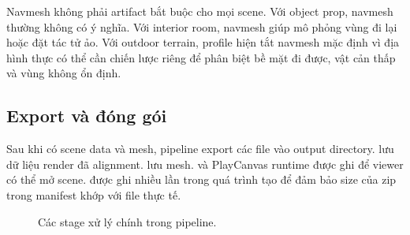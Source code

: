 Navmesh không phải artifact bắt buộc cho mọi scene. Với object prop, navmesh thường không có ý nghĩa. Với interior room, navmesh giúp mô phỏng vùng đi lại hoặc đặt tác tử ảo. Với outdoor terrain, profile hiện tắt navmesh mặc định vì địa hình thực có thể cần chiến lược riêng để phân biệt bề mặt đi được, vật cản thấp và vùng không ổn định.

\subsection{Export và đóng gói}

Sau khi có scene data và mesh, pipeline export các file vào output directory.  lưu dữ liệu render đã alignment.  lưu mesh.  và PlayCanvas runtime được ghi để viewer có thể mở scene.  được ghi nhiều lần trong quá trình tạo  để đảm bảo size của zip trong manifest khớp với file thực tế.

\begin{figure}[H]
\centering
{}
\caption{Các stage xử lý chính trong pipeline.}
\end{figure}
